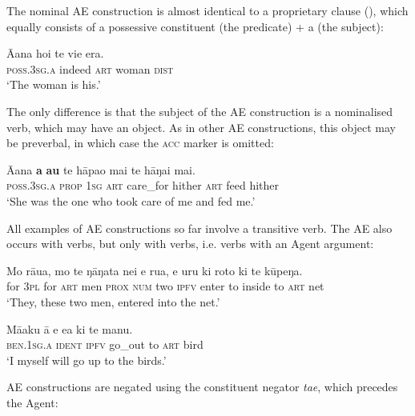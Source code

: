 The nominal AE construction is almost identical to a proprietary clause (), which equally consists of a possessive constituent (the predicate) + a  (the subject): 

\ea\label{ex:8.104}
\gll {\ꞌ}Ā{\ꞌ}ana ho{\ꞌ}i te vi{\ꞌ}e era. \\
\textsc{poss.3sg.a} indeed \textsc{art} woman \textsc{dist} \\

\glt
‘The woman is his.’ \textstyleExampleref{[R416.1156]}
\z

The only difference is that the subject of the AE construction is a nominalised verb, which may have an object. As in other AE constructions, this object may be preverbal, in which case the \textsc{acc} marker is omitted:

\ea\label{ex:8.105}
\gll {\ꞌ}Ā{\ꞌ}ana \textbf{a} \textbf{au} te hāpa{\ꞌ}o mai te hāŋai mai. \\
\textsc{poss.3sg.a} \textsc{prop} \textsc{1sg} \textsc{art} care\_for hither \textsc{art} feed hither \\

\glt 
‘She was the one who took care of me and fed me.’ \textstyleExampleref{[R310.480]} 
\z

All examples of AE constructions so far involve a transitive verb. The AE also occurs with  verbs, but only with  verbs, i.e. verbs with an Agent argument: 

\ea\label{ex:8.106}
\gll Mo rāua, mo te ŋāŋata nei e rua, e uru ki roto ki te kūpeŋa. \\
for \textsc{3pl} for \textsc{art} men \textsc{prox} \textsc{num} two \textsc{ipfv} enter to inside to \textsc{art} net \\

\glt 
‘They, these two men, entered into the net.’ \textstyleExampleref{[R310.265]} 
\z

\ea\label{ex:8.107}
\gll Mā{\ꞌ}aku {\ꞌ}ā e e{\ꞌ}a ki te manu. \\
\textsc{ben.1sg.a} \textsc{ident} \textsc{ipfv} go\_out to \textsc{art} bird \\

\glt 
‘I myself will go up to the birds.’ \textstyleExampleref{[Egt-01.014]}
\z

AE constructions are negated using the constituent negator \textit{ta{\ꞌ}e}, which precedes the Agent:

